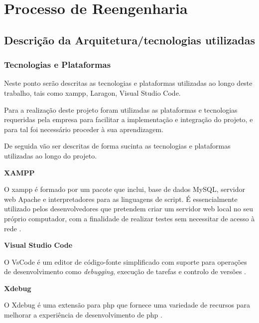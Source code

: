 
\chapter{Processo de Reengenharia}
\label{migracao}

\section{Descrição da Arquitetura/tecnologias utilizadas}
\subsection{Tecnologias e Plataformas}
\label{tecnologias}
\par Neste ponto serão descritas as tecnologias e plataformas utilizadas ao longo deste trabalho, tais como \acrshort{xampp}, Laragon, Visual Studio Code.
\par Para a realização deste projeto foram utilizadas as plataformas e tecnologias requeridas pela empresa para facilitar a implementação e integração do projeto, e para tal foi necessário proceder à sua aprendizagem.
\par De seguida vão ser descritas de forma sucinta as tecnologias e plataformas utilizadas ao longo do projeto.\newline


\textbf{XAMPP}

O \acrshort{xampp} é formado por um pacote que inclui, base de dados MySQL, servidor web Apache e interpretadores para as linguagens de script. É essencialmente utilizado pelos desenvolvedores que pretendem criar um servidor web local no seu próprio computador, com a finalidade de realizar testes sem necessitar de acesso à rede \citep{xampp}.\newline


\textbf{Visual Studio Code}

O VsCode é um editor de código-fonte simplificado com suporte para operações de desenvolvimento como \textit{debugging}, execução de tarefas e controlo de versões \citep{vscode}.\newline %

\quad \textbf{Xdebug}

\quad O Xdebug é uma extensão para \acrshort{php} que fornece uma variedade de recursos para melhorar a experiência de desenvolvimento de \acrshort{php} \citep{xdebug}.\newline


